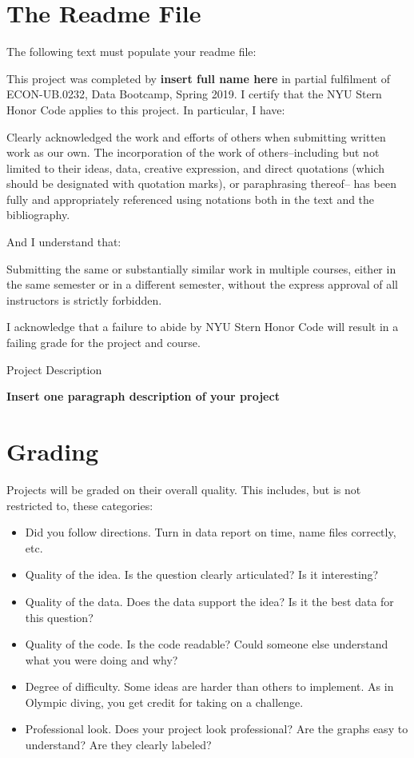 \section*{The Readme File}

The following text must populate your readme file:
\bigskip
\bigskip

This project was completed by \textbf{insert full name here} in partial fulfilment of  ECON-UB.0232, Data Bootcamp, Spring 2019. I certify that the NYU Stern Honor Code applies to this project. In particular, I have:

Clearly acknowledged the work and efforts of others when submitting written work as
our own. The incorporation of the work of others--including but not limited to their ideas,
data, creative expression, and direct quotations (which should be designated with quotation
marks), or paraphrasing thereof-- has been fully and appropriately referenced using notations
both in the text and the bibliography.

And I understand that:

Submitting the same or substantially similar work in multiple courses, either in the
same semester or in a different semester, without the express approval of all instructors is
strictly forbidden.

I acknowledge that a failure to abide by NYU Stern Honor Code will result in a failing grade for the project and course.

Project Description

\textbf{Insert one paragraph description of your project}

\newpage

\section*{Grading}

Projects will be graded on their overall quality.  This includes, but is not restricted to,
these categories:
%
\begin{itemize}
\item Did you follow directions. Turn in data report on time, name files correctly, etc.
\item Quality of the idea.  Is the question clearly articulated?  Is it interesting?
\item Quality of the data.  Does the data support the idea?
Is it the best data for this question?
\item Quality of the code. Is the code readable? Could someone else understand what you were doing and why?
\item Degree of difficulty.  Some ideas are harder than others to implement.
As in Olympic diving, you get credit for taking on a challenge.
\item Professional look.  Does your project look professional?  Are the graphs
easy to understand?  Are they clearly labeled?
\end{itemize}


%



%


